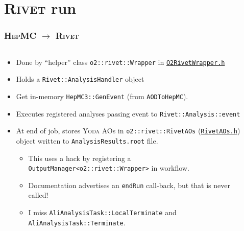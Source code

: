\documentclass[compress,table,8pt]{beamer}
\newcommand\Rivet{{\scshape Rivet}}
\newcommand\Yoda{{\scshape Yoda}}
\newcommand\HepMC{{\scshape HepMC}}
\begin{document}
\section{\Rivet{} run}
\begin{frame}
  \frametitle{\HepMC{} $\rightarrow$ \Rivet{}}

  \begin{columns}[onlytextwidth]
    \begin{column}{.6\linewidth}
      \begin{itemize}
      \item<+-> Done by ``helper'' class \texttt{o2::rivet::Wrapper}
        in
        \href{https://https://github.com/cholmcc/O2Physics/tree/cholmcc_pwgmm_rivet/PWGMM/Rivet/Tasks/Wrapper.h}{\texttt{O2RivetWrapper.h}}
      \item<+-> Holds a \texttt{Rivet::AnalysisHandler} object
      \item<+-> Get in-memory \texttt{HepMC3::GenEvent} (from
        \texttt{AODToHepMC}).
      \item<+-> Executes registered analyses passing event to
        \texttt{Rivet::Analysis::event}
      \item<+-> At end of job, stores \Yoda{} AOs in
        \texttt{o2::rivet::RivetAOs}
        (\href{https://https://github.com/cholmcc/O2Physics/tree/cholmcc_pwgmm_rivet/PWGMM/Rivet/DataModel/RivetAOs.h}{\texttt{RivetAOs.h}})
        object written to \texttt{AnalysisResults.root} file.
        \begin{itemize}
        \item<+-> This uses a hack by registering a
          \texttt{OutputManager<o2::rivet::Wrapper>} in workflow.
        \item<+-> Documentation advertises an \texttt{endRun} call-back,
          but that is never called!
        \item<+-> I miss \texttt{AliAnalysisTask::LocalTerminate} and
          \texttt{AliAnalysisTask::Terminate}.
        \end{itemize}
      \end{itemize}
    \end{column}
    \begin{column}{.35\linewidth}
      \begin{center}
\end{center}
\end{column}
\end{columns}
\end{frame}
\end{document}
